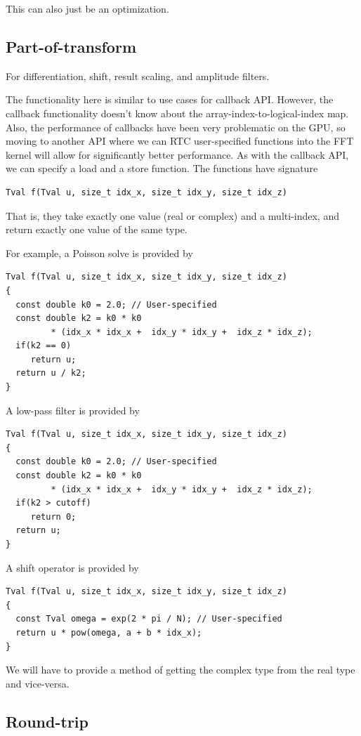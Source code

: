\documentclass[12pt]{article}
\renewcommand{\(}{\left(}
\renewcommand{\)}{\right)}
\begin{document}
This can also just be an optimization.

\subsection{Part-of-transform}

For differentiation, shift, result scaling, and amplitude filters.

The functionality here is similar to use cases for callback API.
However, the callback functionality doesn't know about the
array-index-to-logical-index map.  Also, the performance of callbacks
have been very problematic on the GPU, so moving to another API where
we can RTC user-specified functions into the FFT kernel will allow for
significantly better performance.  As with the callback API, we can specify
a load and a store function.  The functions have signature
\begin{lstlisting}
Tval f(Tval u, size_t idx_x, size_t idx_y, size_t idx_z)
\end{lstlisting}
That is, they take exactly one value (real or complex) and a
multi-index, and return exactly one value of the same type.

For example, a Poisson solve is provided by
\begin{lstlisting}
Tval f(Tval u, size_t idx_x, size_t idx_y, size_t idx_z)
{
  const double k0 = 2.0; // User-specified
  const double k2 = k0 * k0
         * (idx_x * idx_x +  idx_y * idx_y +  idx_z * idx_z);
  if(k2 == 0)
     return u;
  return u / k2;
}
\end{lstlisting}

A low-pass filter is provided by
\begin{lstlisting}
Tval f(Tval u, size_t idx_x, size_t idx_y, size_t idx_z)
{
  const double k0 = 2.0; // User-specified
  const double k2 = k0 * k0
         * (idx_x * idx_x +  idx_y * idx_y +  idx_z * idx_z);
  if(k2 > cutoff)
     return 0;
  return u;
}
\end{lstlisting}

A shift operator is provided by
\begin{lstlisting}
Tval f(Tval u, size_t idx_x, size_t idx_y, size_t idx_z)
{
  const Tval omega = exp(2 * pi / N); // User-specified
  return u * pow(omega, a + b * idx_x);
}
\end{lstlisting}

We will have to provide a method of getting the complex type from the
real type and vice-versa.

\subsection{Round-trip}
\end{document}
